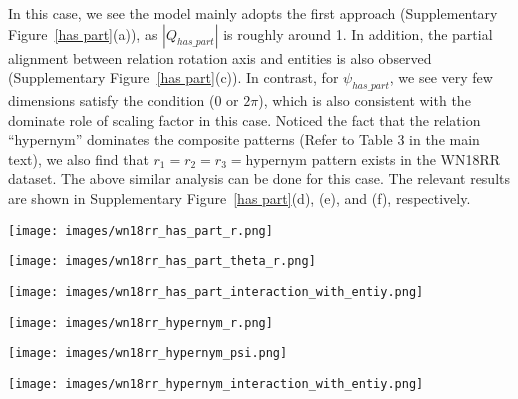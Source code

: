 \documentclass[11pt]{article}
\begin{document}
In this case, we see the model mainly adopts the first approach (Supplementary Figure~\ref{has part}(a)), as \(|Q_{has\_part}|\) is roughly around 1. In addition, the partial alignment between relation rotation axis and entities is also observed (Supplementary Figure~\ref{has part}(c)). In contrast, for \(\psi_{has\_part}\), we see very few dimensions satisfy the condition (\(0 \text{ or } 2\pi\)), which is also consistent with the dominate role of scaling factor in this case. Noticed the fact that the relation ``hypernym'' dominates the composite patterns (Refer to Table 3 in the main text), we also find that \(r_1=r_2=r_3=\text{hypernym}\) pattern exists in the WN18RR dataset. The above similar analysis can be done for this case. The relevant results are shown in Supplementary Figure~\ref{has part}(d), (e), and (f), respectively.







\begin{figure*}[htbp]
\centering
\begin{minipage}{3.8cm}
\centering
\texttt{[image: images/wn18rr\_has\_part\_r.png]}
\end{minipage}
\begin{minipage}{3.8cm}
\centering
\texttt{[image: images/wn18rr\_has\_part\_theta\_r.png]}
\end{minipage}
\begin{minipage}{3.8cm}
\centering
\texttt{[image: images/wn18rr\_has\_part\_interaction\_with\_entiy.png]}
\end{minipage}
\begin{minipage}{3.8cm}
\centering
\texttt{[image: images/wn18rr\_hypernym\_r.png]}
\end{minipage}
\begin{minipage}{3.8cm}
\centering
\texttt{[image: images/wn18rr\_hypernym\_psi.png]}
\end{minipage}
\begin{minipage}{3.8cm}
\centering
\texttt{[image: images/wn18rr\_hypernym\_interaction\_with\_entiy.png]}
\end{minipage}
\caption{Geometric interpretation of composition patterns in \textbf{Situation 1}.}
\label{has part}
\end{figure*}
\end{document}
